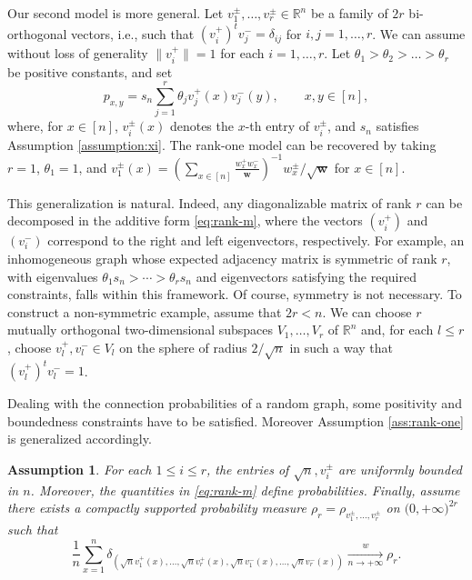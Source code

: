\documentclass[11pt,oneside]{amsart}
\theoremstyle{plain}
\newtheorem{assumption}[theorem]{Assumption}
\numberwithin{equation}{section}
\newcommand{\R}{\mathbb{R}}
\newcommand{\wconv}{\xrightarrow[\textit{n} \to +\infty]{\quad {w} \quad}}
\newcommand{\w}{\boldsymbol{w}}
\newcommand{\scaling}{s_n}
\begin{document}
Our second model is more general.
Let $v^\pm_1,\dots,v^\pm_r \in \R^n$ be a family of $2r$ bi-orthogonal vectors, i.e.,   such that $(v_i^+)^tv_j^- = \delta_{ij}$ for $i,j=1,\dots,r$. We can assume without loss of generality $\|v_i^+\| =1$ for each $i=1,\dots,r$.
Let $\theta_1>\theta_{2}>\dots>\theta_r$ be positive constants, and set
\begin{equation} \label{eq:rank-m}
    p_{x,y} = \scaling\sum_{j=1}^r \theta_j v^+_{j}(x) v^-_{j}(y), \qquad x,y \in [n],
\end{equation} where, for $x \in [n]$, $v_i^\pm(x)$ denotes the $x$-th entry of $v_i^\pm$,  and $\scaling$ satisfies Assumption \ref{assumption:xi}.
The rank-one model can be recovered by taking $r=1$, $\theta_1=1$, and $v^\pm_1(x)=({\sum_{x\in [n]}\tfrac{w_x^+w_x^-}{\w}})^{-1}w_x^\pm/\sqrt{\w}$ for $x \in [n]$.

This generalization is natural. Indeed, any diagonalizable matrix of rank $r$ can be decomposed in the additive form \eqref{eq:rank-m}, where the vectors $(v_i^+)$ and $(v_i^-)$ correspond to the right and left eigenvectors, respectively. For example, an inhomogeneous graph whose expected adjacency matrix is symmetric of rank $r$, with eigenvalues $\theta_1\scaling>\cdots>\theta_r\scaling$ and eigenvectors satisfying the required constraints, falls within this framework.
Of course, symmetry is not necessary. To construct a non-symmetric example, assume that $2r<n$. We can choose $r$ mutually orthogonal two-dimensional subspaces $V_1,\dots,V_r$ of $\mathbb R^n$ and, for each $l\le r$, choose $v_l^+,v_l^-\in V_l$ on the sphere of radius $2/\sqrt n$ in such a way that $(v_l^+)^t v_l^-=1$.


Dealing with the connection probabilities of a random graph, some positivity and boundedness constraints have to be satisfied.
Moreover Assumption \ref{ass:rank-one} is generalized accordingly.
\begin{assumption} \label{ass:rank-m}
For each $1\le i\le r$, the entries of $\sqrt n,v_i^\pm$ are uniformly bounded in $n$. Moreover, the quantities in \eqref{eq:rank-m} define probabilities.
Finally, assume there exists a compactly supported probability measure $\rho_r=\rho_{v_1^\pm,\dots,v_r^\pm}$ on $\mathbb (0, +\infty)^{2r}$ such that
\begin{equation}
\frac1n\sum_{x=1}^n
\delta_{
(\sqrt n v_1^+(x),\dots,\sqrt n v_r^+(x),
\sqrt n v_1^-(x),\dots,\sqrt n v_r^-(x))
}
\wconv \rho_r .
\end{equation}
\end{assumption}
\end{document}
